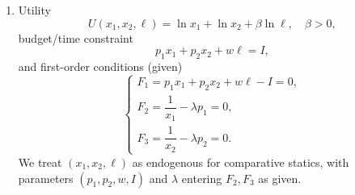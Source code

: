 \documentclass[12pt]{article}
\begin{document}
\begin{enumerate}
Compute $\det(M)$ by expansion along the first row:
\[
\det(M) = u\begin{vmatrix} v & u\\ u & w\end{vmatrix}
 - w\begin{vmatrix} w & u\\ v & w\end{vmatrix}
 + v\begin{vmatrix} w & v\\ v & u\end{vmatrix}.
\]
Evaluate minors:
\[
\begin{vmatrix} v & u\\ u & w\end{vmatrix}=vw-u^2,\qquad
\begin{vmatrix} w & u\\ v & w\end{vmatrix}=w^2-uv,\qquad
\begin{vmatrix} w & v\\ v & u\end{vmatrix}=uw-v^2.
\]
Thus
\[
\det(M)=u(vw-u^2) - w(w^2-uv) + v(uw-v^2)
= 3uvw-(u^3+v^3+w^3).
\]
Therefore
\[
\boxed{\;\det(J)=8\big(3uvw-u^3-v^3-w^3\big).\;}
\]

\subsection*{(b) Evaluate at $(u,v,w)=(1,-2,3)$ and test invertibility.}
Plugging in:
\[
3uvw = 3\cdot 1\cdot (-2)\cdot 3 = -18,\qquad
u^3+v^3+w^3 = 1+(-8)+27 = 20.
\]
Hence
\[
\det(J)=8(-18-20)=8(-38)=-304\neq 0.
\]
Conclusion: $J$ is nonsingular, so the mapping is locally invertible at $(1,-2,3)$ (inverse function theorem).

\vspace{1 cm}

\item
Utility
\[
U(x_1,x_2,\ell)=\ln x_1 + \ln x_2 + \beta \ln \ell,\quad \beta>0,
\]
budget/time constraint
\[
p_1x_1+p_2x_2+w\ell=I,
\]
and first-order conditions (given)
\[
\begin{cases}
F_1=p_1x_1+p_2x_2+w\ell - I=0,\\
F_2=\dfrac{1}{x_1}-\lambda p_1=0,\\
F_3=\dfrac{1}{x_2}-\lambda p_2=0.
\end{cases}
\]
We treat $(x_1,x_2,\ell)$ as endogenous for comparative statics, with parameters $(p_1,p_2,w,I)$ and $\lambda$ entering $F_2,F_3$ as given.


\end{enumerate}
\end{document}
